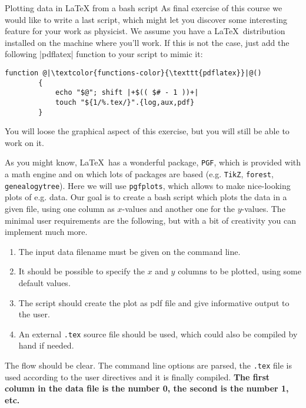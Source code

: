 
\begin{exercise}[Inspirational]{Plotting data in LaTeX from a bash script}
    As final exercise of this course we would like to write a last script, which might let you discover some interesting feature for your work as physicist.
    We assume you have a \LaTeX\ distribution installed on the machine where you'll work.
    If this is not the case, just add the following \bash|pdflatex| function to your script to mimic it:
    \begin{lstlisting}[style=myBash]
        function @|\textcolor{functions-color}{\texttt{pdflatex}}|@()
        {
            echo "$@"; shift |+$(( $# - 1 ))+|
            touch "${1/%.tex/}".{log,aux,pdf}
        }
    \end{lstlisting}
    You will loose the graphical aspect of this exercise, but you will still be able to work on it.

    As you might know, \LaTeX\ has a wonderful package, \texttt{PGF}, which is provided with a math engine and on which lots of packages are based (e.g. \texttt{TikZ}, \texttt{forest}, \texttt{genealogytree}).
    Here we will use \texttt{pgfplots}, which allows to make nice-looking plots of e.g. data.
    Our goal is to create a bash script which plots the data in a given file, using one column as $x$-values and another one for the $y$-values.
    The minimal user requirements are the following, but with a bit of creativity you can implement much more.
    \begin{enumerate}
        \item The input data filename must be given on the command line.
        \item It should be possible to specify the $x$ and $y$ columns to be plotted, using some default values.
        \item The script should create the plot as pdf file and give informative output to the user.
        \item An external \texttt{.tex} source file should be used, which could also be compiled by hand if needed.
    \end{enumerate}

    The flow should be clear.
    The command line options are parsed, the \texttt{.tex} file is used according to the user directives and it is finally compiled.
    \textbf{The first column in the data file is the number 0, the second is the number 1, etc.}


\end{exercise}
